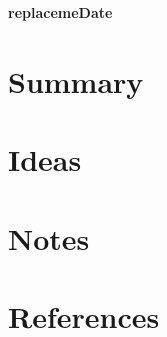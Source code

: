 \documentclass[10pt,numbers=noenddot]{article}
\begin{document}
\begin{flushright}\textbf{\Large replacemeDate} \end{flushright} \hfill
\lline

\section*{Summary}
\section*{Ideas}
\section*{Notes}
\section*{References}
\end{document}

